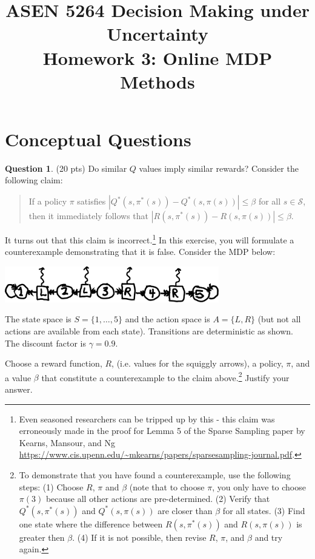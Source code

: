 \documentclass{article}
\title{ASEN 5264 Decision Making under Uncertainty\\
       Homework 3: Online MDP Methods}
\theoremstyle{definition}
\newtheorem{question}[thm]{Question}
\begin{document}
\maketitle

\section{Conceptual Questions}

\begin{question} (20 pts) Do similar $Q$ values imply similar rewards?
    Consider the following claim:
    \begin{quote}
    If a policy $\pi$ satisfies $|Q^*(s, \pi^*(s)) - Q^*(s, \pi(s))| \leq \beta$ for all $s \in \mathcal{S}$, then it immediately follows that $|R(s, \pi^*(s)) - R(s, \pi(s))| \leq \beta$.
    \end{quote}
    It turns out that this claim is incorrect.\footnote{Even seasoned researchers can be tripped up by this - this claim was erroneously made in the proof for Lemma 5 of the Sparse Sampling paper by Kearns, Mansour, and Ng \url{https://www.cis.upenn.edu/~mkearns/papers/sparsesampling-journal.pdf}.} In this exercise, you will formulate a counterexample demonstrating that it is false. Consider the MDP below:
    \begin{center}
        \includegraphics[width=0.7\textwidth]{hand_mdp.pdf}
    \end{center}
    The state space is $S = \{1, \ldots, 5\}$ and the action space is $A = \{L, R\}$ (but not all actions are available from each state). Transitions are deterministic as shown. The discount factor is $\gamma=0.9$.

    Choose a reward function, $R$, (i.e. values for the squiggly arrows), a policy, $\pi$, and a value $\beta$ that constitute a counterexample to the claim above.\footnote{To demonstrate that you have found a counterexample, use the following steps: (1) Choose $R$, $\pi$ and $\beta$ (note that to choose $\pi$, you only have to choose $\pi(3)$ because all other actions are pre-determined. (2) Verify that $Q^*(s, \pi^*(s))$ and $Q^*(s, \pi(s))$ are closer than $\beta$ for all states. (3) Find one state where the difference between $R(s, \pi^*(s))$ and $R(s, \pi(s))$ is greater then $\beta$. (4) If it is not possible, then revise $R$, $\pi$, and $\beta$ and try again.} Justify your answer.
\end{question}
\end{document}
